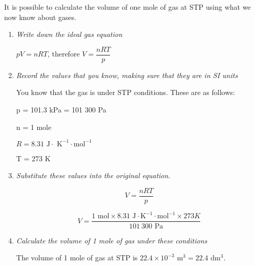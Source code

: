 It is possible to calculate the volume of one mole of gas at STP using what we now know about gases.

\begin{enumerate}

\item{\textit{Write down the ideal gas equation}}
\begin{center}
$pV = nRT$, therefore $V = \dfrac{nRT}{p}$
\end{center}

\item{\textit{Record the values that you know, making sure that they are in SI units}}

You know that the gas is under STP conditions. These are as follows:

p = 101.3 kPa = 101 300 Pa

n = 1 mole

$R = 8.31 \text{ J} \cdot \text{ K}^{-1} \cdot \text{mol}^{-1}$

T = 273 K

\item{\textit{Substitute these values into the original equation.}}

\begin{equation*}
V = \frac{nRT}{p}
\end{equation*}

\begin{equation*}
V = \frac{1 \text{ mol} \times 8.31 \text{ J} \cdot \text{K}^{-1} \cdot \text{mol}^{-1} \times 273 K}{101~300 \text{ Pa}}
\end{equation*}

\item{\textit{Calculate the volume of 1 mole of gas under these conditions}

The volume of 1 mole of gas at STP is $22.4 \times 10^{-3}$ m$^{3} = 22.4$ dm$^{3}$.}
\end{enumerate}


